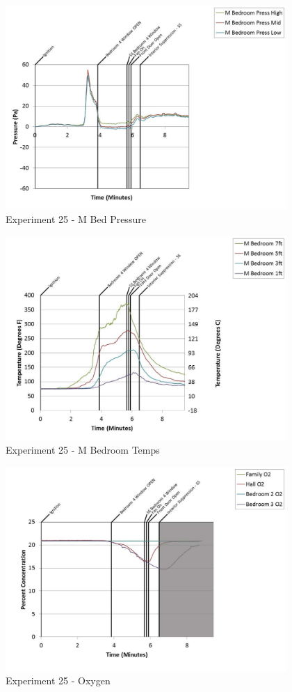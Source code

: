\documentclass{article}
\begin{document}
\begin{appendices}
	\begin{figure}[h!]
		\centering
		\includegraphics[height=3.05in]{0_Images/Results_Charts/Exp_25_Charts/MBedPressure.pdf}
		\caption{Experiment 25 - M Bed Pressure}
	\end{figure}
 
	\clearpage

	\begin{figure}[h!]
		\centering
		\includegraphics[height=3.05in]{0_Images/Results_Charts/Exp_25_Charts/MBedroomTemps.pdf}
		\caption{Experiment 25 - M Bedroom Temps}
	\end{figure}
 

	\begin{figure}[h!]
		\centering
		\includegraphics[height=3.05in]{0_Images/Results_Charts/Exp_25_Charts/Oxygen.pdf}
		\caption{Experiment 25 - Oxygen}
	\end{figure}
 

\end{appendices}
\end{document}
